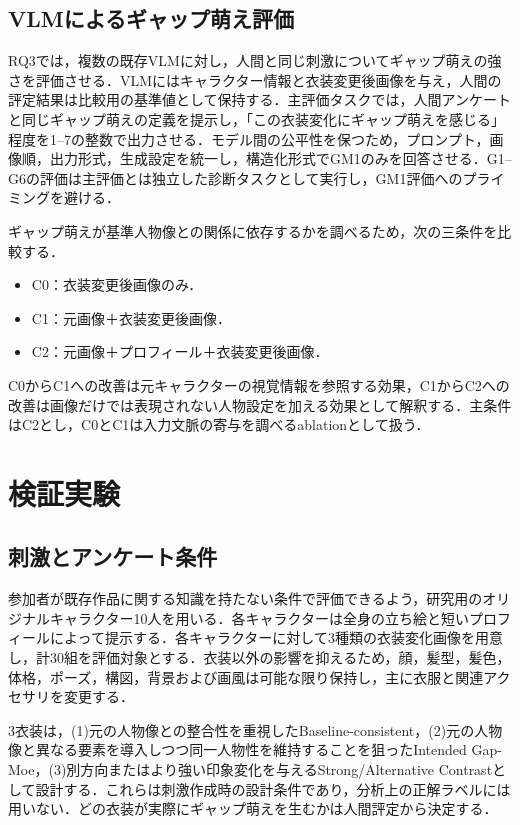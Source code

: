 \documentclass[a4j,twocolumn,11pt]{jarticle}
\begin{document}
\subsection{VLMによるギャップ萌え評価}
RQ3では，複数の既存VLMに対し，人間と同じ刺激についてギャップ萌えの強さを評価させる．VLMにはキャラクター情報と衣装変更後画像を与え，人間の評定結果は比較用の基準値として保持する．主評価タスクでは，人間アンケートと同じギャップ萌えの定義を提示し，「この衣装変化にギャップ萌えを感じる」程度を1--7の整数で出力させる．モデル間の公平性を保つため，プロンプト，画像順，出力形式，生成設定を統一し，構造化形式でGM1のみを回答させる．G1--G6の評価は主評価とは独立した診断タスクとして実行し，GM1評価へのプライミングを避ける．

ギャップ萌えが基準人物像との関係に依存するかを調べるため，次の三条件を比較する．
\begin{itemize}
 \item C0：衣装変更後画像のみ．
 \item C1：元画像＋衣装変更後画像．
 \item C2：元画像＋プロフィール＋衣装変更後画像．
\end{itemize}
C0からC1への改善は元キャラクターの視覚情報を参照する効果，C1からC2への改善は画像だけでは表現されない人物設定を加える効果として解釈する．主条件はC2とし，C0とC1は入力文脈の寄与を調べるablationとして扱う．

\section{検証実験}
\subsection{刺激とアンケート条件}
参加者が既存作品に関する知識を持たない条件で評価できるよう，研究用のオリジナルキャラクター10人を用いる．各キャラクターは全身の立ち絵と短いプロフィールによって提示する．各キャラクターに対して3種類の衣装変化画像を用意し，計30組を評価対象とする．衣装以外の影響を抑えるため，顔，髪型，髪色，体格，ポーズ，構図，背景および画風は可能な限り保持し，主に衣服と関連アクセサリを変更する．

3衣装は，(1)元の人物像との整合性を重視したBaseline-consistent，(2)元の人物像と異なる要素を導入しつつ同一人物性を維持することを狙ったIntended Gap-Moe，(3)別方向またはより強い印象変化を与えるStrong/Alternative Contrastとして設計する．これらは刺激作成時の設計条件であり，分析上の正解ラベルには用いない．どの衣装が実際にギャップ萌えを生むかは人間評定から決定する．
\end{document}
